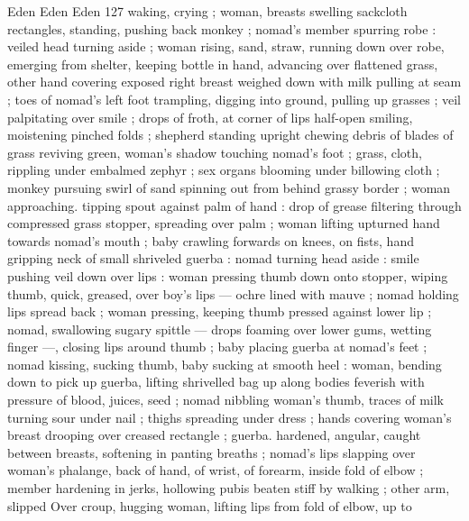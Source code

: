 Eden Eden Eden 127
waking, crying ; woman, breasts swelling sackcloth rectangles,
standing, pushing back monkey ; nomad’s member spurring robe :
veiled head turning aside ; woman rising, sand, straw, running down
over robe, emerging from shelter, keeping bottle in hand, advancing
over flattened grass, other hand covering exposed right breast
weighed down with milk pulling at seam ; toes of nomad's left foot
trampling, digging into ground, pulling up grasses ; veil palpitating
over smile ; drops of froth, at corner of lips half-open smiling,
moistening pinched folds ; shepherd standing upright chewing debris
of blades of grass reviving green, woman's shadow touching
nomad’s foot ; grass, cloth, rippling under embalmed zephyr ; sex
organs blooming under billowing cloth ; monkey pursuing swirl of
sand spinning out from behind grassy border ; woman approaching.
tipping spout against palm of hand : drop of grease filtering through
compressed grass stopper, spreading over palm ; woman lifting
upturned hand towards nomad’s mouth ; baby crawling forwards on
knees, on fists, hand gripping neck of small shriveled guerba :
nomad turning head aside : smile pushing veil down over lips :
woman pressing thumb down onto stopper, wiping thumb, quick,
greased, over boy's lips — ochre lined with mauve ; nomad holding
lips spread back ; woman pressing, keeping thumb pressed against
lower lip ; nomad, swallowing sugary spittle — drops foaming over
lower gums, wetting finger —, closing lips around thumb ; baby
placing guerba at nomad's feet ; nomad kissing, sucking thumb, baby
sucking at smooth heel : woman, bending down to pick up guerba,
lifting shrivelled bag up along bodies feverish with pressure of
blood, juices, seed ; nomad nibbling woman's thumb, traces of milk
turning sour under nail ; thighs spreading under dress ; hands
covering woman's breast drooping over creased rectangle ; guerba.
hardened, angular, caught between breasts, softening in panting
breaths ; nomad's lips slapping over woman's phalange, back of
hand, of wrist, of forearm, inside fold of elbow ; member hardening
in jerks, hollowing pubis beaten stiff by walking ; other arm, slipped
Over croup, hugging woman, lifting lips from fold of elbow, up to

